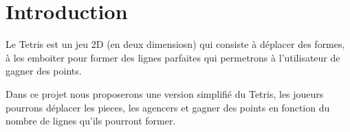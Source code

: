 \section{Introduction}\label{introduction}

Le Tetris est un jeu 2D (en deux dimensiosn) qui consiste à déplacer des formes, à les 
emboiter pour former des lignes parfaites qui permetrons à l'utilisateur de gagner des points.

Dans ce projet nous proposerons une version simplifié du Tetris, les joueurs pourrons déplacer
les pieces, les agencers et gagner des points en fonction du nombre de lignes qu'ils pourront former.